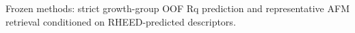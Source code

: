 Frozen methods: strict growth-group OOF Rq prediction and representative AFM retrieval conditioned on RHEED-predicted descriptors.
